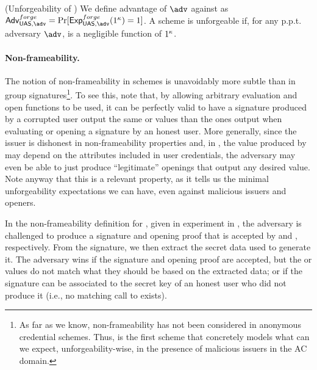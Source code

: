 

\begin{definition}{(Unforgeability of \UAS)}
  \label{def:forge-uas}  
  We define advantage \AdvForge of $\adv$ against \ExpForge as $\AdvForge=
  \Pr\lbrack\ExpForge(1^\secpar)=1\rbrack$.
  A \UAS scheme is unforgeable if, for any p.p.t. adversary $\adv$, \AdvForge is
  a negligible function of $1^\kappa$.
\end{definition}

\paragraph{Non-frameability.} %
The notion of non-frameability in \UAS schemes is unavoidably more subtle than
in group signatures\footnote{As far as we know, non-frameability has not been
  considered in anonymous credential schemes. Thus, \UAS is the first scheme
  that concretely models what can we expect, unforgeability-wise, in the
  presence of malicious issuers in the AC domain.}. To see
this, note that, by allowing arbitrary evaluation and open functions to be used,
it can be perfectly valid to have a signature produced by a corrupted user
output the same \yeval or \yinsp values than the ones output when evaluating or
opening a signature by an honest user.
%
More generally, since the issuer is dishonest in non-frameability properties
and, in \UAS, the value produced by \Open may depend on the attributes
included in user credentials, the adversary may even be able to just produce
``legitimate'' openings that output any desired value. Note anyway that this is
a relevant property, as it tells us the minimal unforgeability expectations we
can have, even against malicious issuers and openers.

In the non-frameability definition for \UAS, given in experiment \ExpNonframe in
, the adversary is challenged to produce a signature
and opening proof that is accepted by \Verify and \Judge, respectively. From
the signature, we then extract the secret data used to generate it. The
adversary wins if the signature and opening proof are accepted, but the \yeval
or \yinsp values do not match what they should be based on the extracted data;
or if the signature can be associated to the secret key of an honest user who
did not produce it (i.e., no matching call to \SIGN exists).


